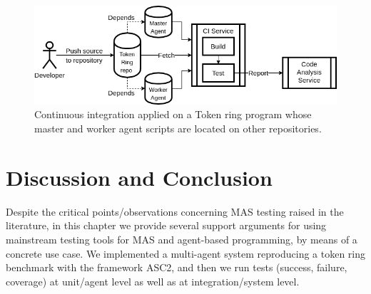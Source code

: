 \begin{figure}[t!]
  \centering
  \hspace{-5pt}
  \includegraphics[width=1\linewidth]{ch_emas/ci.png}
  \caption{Continuous integration applied on a Token ring program whose master and worker agent scripts are located on other repositories.}
  \label{fig:ci}
\end{figure}


\section{Discussion and Conclusion}
\label{sec:discussion}

Despite the critical points/observations concerning MAS testing raised in the literature, in this chapter we %
provide several support arguments for using  mainstream testing tools for MAS and agent-based programming, by means of a concrete use case. We implemented a multi-agent system reproducing a token ring benchmark with the framework ASC2, and then we run tests (success, failure, coverage) at unit/agent level as well as at integration/system level. 




